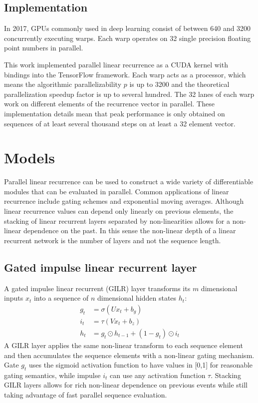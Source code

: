 \documentclass{article}
\begin{document}
\subsection{Implementation}
In 2017, GPUs commonly used in deep learning consist of between 640 and 3200
concurrently executing warps. Each warp operates on 32 single precision floating
point numbers in parallel.

This work implemented parallel linear recurrence as a CUDA kernel with bindings
into the TensorFlow \cite{abadi2016tensorflow} framework. Each warp acts as a
processor, which means the algorithmic parallelizability $p$ is up to 3200 and the theoretical
parallelization speedup factor is up to several hundred.  The 32 lanes of each
warp work on different elements of the recurrence vector in parallel. These
implementation details mean that peak performance is only obtained on sequences
of at least several thousand steps on at least a 32 element vector.

\section{Models}
Parallel linear recurrence can be used to construct a wide variety of differentiable modules that can be evaluated in parallel. Common applications of linear recurrence include gating schemes and exponential moving averages. Although linear recurrence values can depend only linearly on previous elements, the stacking of linear recurrent layers separated by non-linearities allows for a non-linear dependence on the past. In this sense the non-linear depth of a linear recurrent network is the number of layers and not the sequence length. 

\subsection{Gated impulse linear recurrent layer}
A gated impulse linear recurrent (GILR) layer transforms its $m$ dimensional inputs $x_t$ into a sequence of $n$ dimensional hidden states $h_t$:
\begin{align*}
g_t &= \sigma(Ux_t + b_g) \\
i_t &= \tau(Vx_t + b_z) \\
h_t &= g_t \odot h_{t-1} + (1-g_t)\odot i_t
\end{align*}
A GILR layer applies the same non-linear transform to each sequence element and then accumulates the sequence elements with a non-linear gating mechanism. Gate $g_t$ uses the sigmoid activation function to have values in [0,1] for reasonable gating semantics, while impulse $i_t$ can use any activation function $\tau$. Stacking GILR layers allows for rich non-linear dependence on previous events while still taking advantage of fast parallel sequence evaluation.
\end{document}
